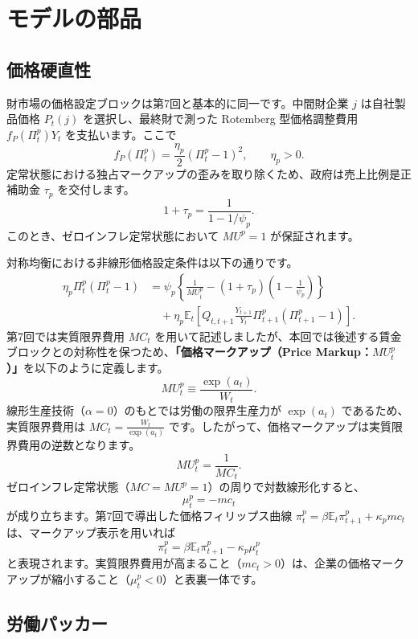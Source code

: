 \documentclass[
  japanese,
  lualatex,
  ja=standard,
  12pt,
  a4paper]{ltjsarticle}
\begin{document}
\section{モデルの部品}\label{ux30e2ux30c7ux30ebux306eux90e8ux54c1}

\subsection{価格硬直性}\label{ux4fa1ux683cux786cux76f4ux6027}

財市場の価格設定ブロックは第7回と基本的に同一です。中間財企業 \(j\)
は自社製品価格 \(P_t(j)\) を選択し、最終財で測った Rotemberg
型価格調整費用 \(f_P(\Pi_t^p)Y_t\) を支払います。ここで \[
f_P(\Pi_t^p)=\frac{\eta_p}{2}(\Pi_t^p-1)^2,
\qquad
\eta_p>0.
\]
定常状態における独占マークアップの歪みを取り除くため、政府は売上比例是正補助金
\(\tau_p\) を交付します。 \[
1+\tau_p=\frac{1}{1-1/\psi_p}.
\] このとき、ゼロインフレ定常状態において \(MU^p=1\) が保証されます。

対称均衡における非線形価格設定条件は以下の通りです。 \[
\begin{aligned}
\eta_p\Pi_t^p(\Pi_t^p-1)
&=
\psi_p
\left\{
\frac{1}{MU_t^p}
-
(1+\tau_p)\left(1-\frac{1}{\psi_p}\right)
\right\}
\\
&\quad+
\eta_p\mathbb{E}_t
\left[
Q_{t,t+1}
\frac{Y_{t+1}}{Y_t}
\Pi_{t+1}^p(\Pi_{t+1}^p-1)
\right].
\end{aligned}
\] 第7回では実質限界費用 \(MC_t\)
を用いて記述しましたが、本回では後述する賃金ブロックとの対称性を保つため、\textbf{「価格マークアップ（Price
Markup：\(MU_t^p\)）」}を以下のように定義します。 \[
MU_t^p\equiv\frac{\exp(a_t)}{W_t}.
\] 線形生産技術（\(\alpha=0\)）のもとでは労働の限界生産力が
\(\exp(a_t)\) であるため、実質限界費用は
\(MC_t = \frac{W_t}{\exp(a_t)}\)
です。したがって、価格マークアップは実質限界費用の逆数となります。 \[
MU_t^p=\frac{1}{MC_t}.
\] ゼロインフレ定常状態（\(MC=MU^p=1\)）の周りで対数線形化すると、 \[
\mu_t^p=-mc_t
\] が成り立ちます。第7回で導出した価格フィリップス曲線
\(\pi_t^p = \beta\mathbb{E}_t\pi_{t+1}^p + \kappa_p mc_t\)
は、マークアップ表示を用いれば \[
\pi_t^p
=
\beta\mathbb{E}_t\pi_{t+1}^p
-
\kappa_p\mu_t^p
\]
と表現されます。実質限界費用が高まること（\(mc_t>0\)）は、企業の価格マークアップが縮小すること（\(\mu_t^p<0\)）と表裏一体です。

\subsection{労働パッカー}\label{ux52b4ux50cdux30d1ux30c3ux30abux30fc}
\end{document}
